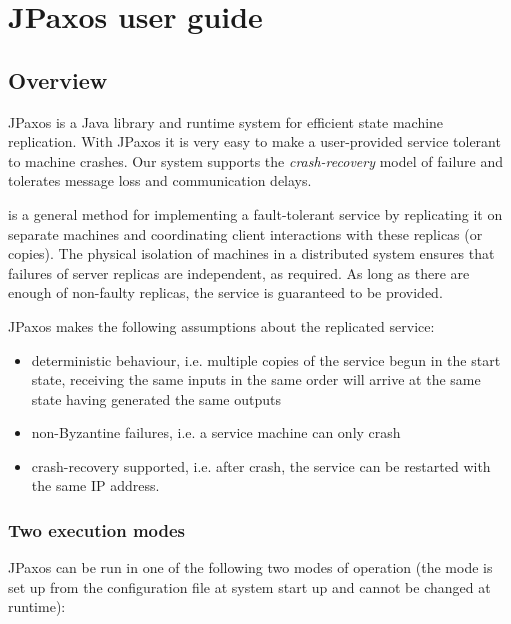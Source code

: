 \chapter{JPaxos user guide}

\section{Overview}
\label{overview:overview}\label{overview::doc}\label{overview:jpaxos-user-guide}
JPaxos is a Java library and runtime system for efficient state machine
replication. \linebreak With JPaxos it is very easy to make a user-provided
service tolerant to machine crashes. Our system supports the \emph{crash-recovery}
model of failure and tolerates message loss and communication delays.
\begin{description}
\item[{\href{http://en.wikipedia.org/wiki/State\_machine\_replication}{State machine replication}}] \leavevmode{}\label{overview:term-state-machine-replication}
is a general method for implementing a fault-tolerant service by
replicating it on separate machines and coordinating client interactions
with these replicas (or copies). The physical isolation of machines in
a distributed system ensures that failures of server replicas are
independent, as required. \linebreak As long as there are enough of non-faulty
replicas, the service is guaranteed to be provided.

\end{description}

JPaxos makes the following assumptions about the replicated service:
\begin{itemize}
\item {} 
deterministic behaviour, i.e. multiple copies of the service begun in
the start state, receiving the same inputs in the same order will
arrive at the same state having generated the same outputs

\item {} 
non-Byzantine failures, i.e. a service machine can only crash

\item {} 
crash-recovery supported, i.e. after crash, the service can be restarted
with the same IP address.

\end{itemize}


\subsection{Two execution modes}
\label{overview:two-execution-modes}
JPaxos can be run in one of the following two modes of operation
(the mode is set up from the configuration file at system start up
and cannot be changed at runtime):

